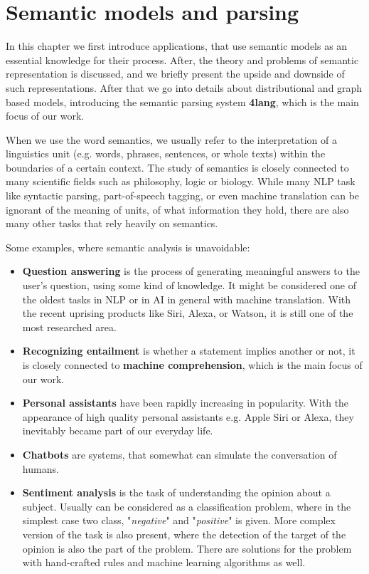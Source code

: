 \chapter{Semantic models and parsing}
\label{chap:semanticparsing}

In this chapter we first introduce applications, that use semantic models as an essential knowledge for their process. After, the theory and problems of semantic representation is discussed, and we briefly present the upside and downside of such representations. After that we go into details about distributional and graph based models, introducing the semantic parsing system \textbf{4lang}, which is the main focus of our work.

When we use the word semantics, we usually refer to the interpretation of a linguistics unit (e.g. words, phrases, sentences, or whole texts) within the boundaries of a certain context. The study of semantics is closely connected to many scientific fields such as philosophy, logic or biology. While many NLP task like syntactic parsing, part-of-speech tagging, or even machine translation can be ignorant of the meaning of units, of what information they hold, there are also many other tasks that rely heavily on semantics.

Some examples, where semantic analysis is unavoidable:
\begin{itemize}
	\item \textbf{Question answering} is the process of generating meaningful answers to the user's question, using some kind of knowledge. It might be considered one of the oldest tasks in NLP or in AI in general with machine translation. With the recent uprising products like Siri, Alexa, or Watson, it is still one of the most researched area.
	\item \textbf{Recognizing entailment} is whether a statement implies another or not, it is closely connected to \textbf{machine comprehension}, which is the main focus of our work.
	\item \textbf{Personal assistants} have been rapidly increasing in popularity. With the appearance of high quality personal assistants e.g. Apple Siri or Alexa, they inevitably became part of our everyday life.
	\item \textbf{Chatbots} are systems, that somewhat can simulate the conversation of humans.
	\item \textbf{Sentiment analysis} is the task of understanding the opinion about a subject. Usually can be considered as a classification problem, where in the simplest case two class, "\textit{negative}" and "\textit{positive}" is given. More complex version of the task is also present, where the detection of the target of the opinion is also the part of the problem. There are solutions for the problem with hand-crafted rules and machine learning algorithms as well.  
\end{itemize}

